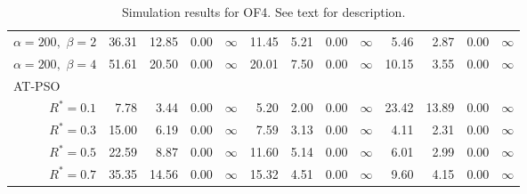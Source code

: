\documentclass[12pt]{article}
\begin{document}
\begin{table}[ht]
{\begin{tabular}{r|rrrr|rrrr|rrrr}
  $\alpha = 200,$ $\beta =2$ & 36.31 & 12.85 & 0.00 & $\infty$ & 11.45 & 5.21 & 0.00 & $\infty$ & 5.46 & 2.87 & 0.00 & $\infty$ \\ 
  $\alpha = 200,$ $\beta =4$ & 51.61 & 20.50 & 0.00 & $\infty$ & 20.01 & 7.50 & 0.00 & $\infty$ & 10.15 & 3.55 & 0.00 & $\infty$ \\ 
\hline
\multicolumn{1}{l|}{AT-PSO} &&&&&&&&&&&&\\
  $R^* = 0.1$ & 7.78 & 3.44 & 0.00 & $\infty$ & 5.20 & 2.00 & 0.00 & $\infty$ & 23.42 & 13.89 & 0.00 & $\infty$ \\ 
  $R^* = 0.3$ & 15.00 & 6.19 & 0.00 & $\infty$ & 7.59 & 3.13 & 0.00 & $\infty$ & 4.11 & 2.31 & 0.00 & $\infty$ \\ 
  $R^* = 0.5$ & 22.59 & 8.87 & 0.00 & $\infty$ & 11.60 & 5.14 & 0.00 & $\infty$ & 6.01 & 2.99 & 0.00 & $\infty$ \\ 
  $R^* = 0.7$ & 35.35 & 14.56 & 0.00 & $\infty$ & 15.32 & 4.51 & 0.00 & $\infty$ & 9.60 & 4.15 & 0.00 & $\infty$ \\ 
   \hline
\end{tabular}
}
\caption{Simulation results for OF4. See text for description.}
\label{tab:psosim4}
\end{table}
\end{document}
